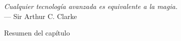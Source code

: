 \label{chap:intro}
\begin{flushright}{\slshape
    Cualquier tecnología avanzada es equivalente a la magia.} \\ \medskip
    --- {Sir Arthur C. Clarke}
\end{flushright}

	\medskip	
Resumen del capítulo


\vfill  
\minitoc\mtcskip

\clearpage


